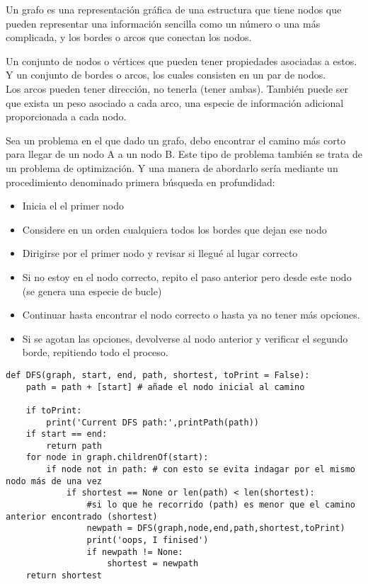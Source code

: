Un grafo es una representación gráfica de una estructura que tiene nodos que pueden representar una información sencilla como un número o una más complicada, y los bordes o arcos que conectan los nodos.

Un conjunto de nodos o vértices que pueden tener propiedades asociadas a estos. Y un conjunto de bordes o arcos, los cuales consisten en un par de nodos.\\

Los arcos pueden tener dirección, no tenerla (tener ambas). También puede ser que exista un peso asociado a cada arco, una especie de información adicional proporcionada a cada nodo.

Sea un problema en el que dado un grafo, debo encontrar el camino más corto para llegar de un nodo A a un nodo B. Este tipo de problema también se trata de un problema de optimización. Y una manera de abordarlo sería mediante un procedimiento denominado primera búsqueda en profundidad:


\begin{itemize}
    \item Inicia el el primer nodo
    \item Considere en un orden cualquiera todos los bordes que dejan ese nodo
    \item Dirigirse por el primer nodo y revisar si llegué al lugar correcto
    \item Si no estoy en el nodo correcto, repito el paso anterior pero desde este nodo (se genera una especie de bucle)
    \item Continuar hasta encontrar el nodo correcto o hasta ya no tener más opciones. 
    \item Si se agotan las opciones, devolverse al nodo anterior y verificar el segundo borde, repitiendo todo el proceso. 
\end{itemize}

\begin{verbatim}
def DFS(graph, start, end, path, shortest, toPrint = False):
    path = path + [start] # añade el nodo inicial al camino
    
    if toPrint:
        print('Current DFS path:',printPath(path))
    if start == end:
        return path
    for node in graph.childrenOf(start):
        if node not in path: # con esto se evita indagar por el mismo nodo más de una vez
            if shortest == None or len(path) < len(shortest):
                #si lo que he recorrido (path) es menor que el camino anterior encontrado (shortest)
                newpath = DFS(graph,node,end,path,shortest,toPrint)
                print('oops, I finised')
                if newpath != None:
                    shortest = newpath
    return shortest

\end{verbatim}

